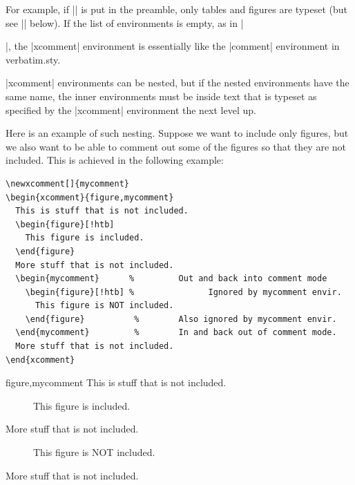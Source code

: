 \documentclass{article}
\begin{document}
For example, if || is put in the preamble, only
tables and figures are typeset (but see |\nofloat| below). If the list of
environments is empty, as in |\begin{xcomment}{}|, the |xcomment|
environment is essentially like the |comment| environment in verbatim.sty.

|xcomment| environments can be nested, but if the nested environments
have the same name, the inner environments must be inside text that is
typeset as specified by the |xcomment| environment the next level up.

Here is an example of such nesting. Suppose we want to include only figures,
but we also want to be able to comment out some of the figures so that they
are not included. This is achieved in the following example:

\begin{Verbatim}
\newxcomment[]{mycomment}
\begin{xcomment}{figure,mycomment}
  This is stuff that is not included.
  \begin{figure}[!htb]
    This figure is included.
  \end{figure}
  More stuff that is not included.
  \begin{mycomment}      %         Out and back into comment mode
    \begin{figure}[!htb] %               Ignored by mycomment envir.
      This figure is NOT included.
    \end{figure}          %        Also ignored by mycomment envir.
  \end{mycomment}         %        In and back out of comment mode.
  More stuff that is not included.
\end{xcomment}
\end{Verbatim}


\begin{xcomment}{figure,mycomment}
  This is stuff that is not included.
  \begin{figure}[!htb]
    This figure is included.
  \end{figure}
  More stuff that is not included.
  \begin{mycomment}      %
    \begin{figure}[!htb] %
      This figure is NOT included.
    \end{figure}          %
  \end{mycomment}         %
  More stuff that is not included.
\end{xcomment}




\end{xcomment}
\end{document}
